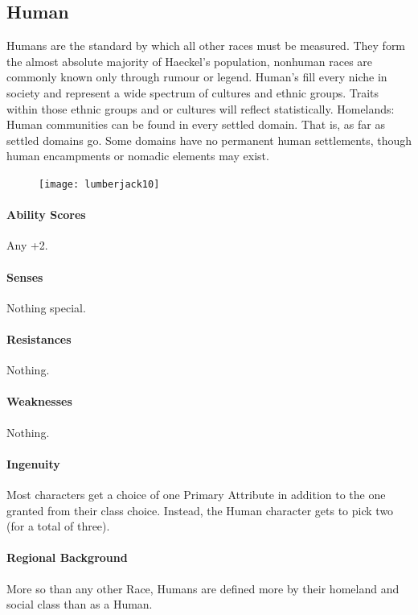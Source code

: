 \begin{multicols}{2}
\section{Human} Humans are the standard by which all other races must be measured. They form the almost absolute majority of Haeckel's population, nonhuman races are commonly known only through rumour or legend. Human's fill every niche in society and represent a wide spectrum of cultures and ethnic groups. Traits within those ethnic groups and or cultures will reflect statistically. Homelands: Human communities can be found in every settled domain. That is, as far as settled domains go. Some domains have no permanent human settlements, though human encampments or nomadic elements may exist.

\begin{figure}[h]
\texttt{[image: lumberjack10]}
\end{figure} 

    \paragraph{Ability Scores} Any +2.
    \paragraph{Senses} Nothing special.
    \paragraph{Resistances} Nothing. 
    \paragraph{Weaknesses} Nothing.
    
    \paragraph{Ingenuity} Most characters get a choice of one Primary Attribute in addition to the one granted from their class choice. Instead, the Human character gets to pick two (for a total of three). 
    
    \paragraph{Regional Background} More so than any other Race, Humans are defined more by their homeland and social class than as a Human. 




\end{multicols}
